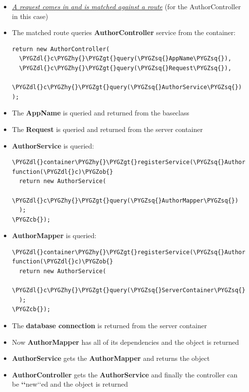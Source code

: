 \documentclass[letterpaper,10pt,english]{sphinxmanual}
\def\PYGZob{\char`\{}
\def\PYGZcb{\char`\}}
\def\PYGZgt{\char`\>}
\def\PYGZdl{\char`\$}
\def\PYGZhy{\char`\-}
\def\PYGZsq{\char`\'}
\renewcommand\PYGZsq{\textquotesingle}
\begin{document}
\begin{itemize}
\item {} 
{\hyperref[app/request::doc]{\emph{\emph{A request comes in and is matched against a route}}}} (for the AuthorController in this case)

\item {} 
The matched route queries \textbf{AuthorController} service from the container:

\begin{Verbatim}[commandchars=\\\{\}]
return new AuthorController(
  \PYGZdl{}c\PYGZhy{}\PYGZgt{}query(\PYGZsq{}AppName\PYGZsq{}),
  \PYGZdl{}c\PYGZhy{}\PYGZgt{}query(\PYGZsq{}Request\PYGZsq{}),
  \PYGZdl{}c\PYGZhy{}\PYGZgt{}query(\PYGZsq{}AuthorService\PYGZsq{})
);
\end{Verbatim}

\item {} 
The \textbf{AppName} is queried and returned from the baseclass

\item {} 
The \textbf{Request} is queried and returned from the server container

\item {} 
\textbf{AuthorService} is queried:

\begin{Verbatim}[commandchars=\\\{\}]
\PYGZdl{}container\PYGZhy{}\PYGZgt{}registerService(\PYGZsq{}AuthorService\PYGZsq{}, function(\PYGZdl{}c)\PYGZob{}
  return new AuthorService(
    \PYGZdl{}c\PYGZhy{}\PYGZgt{}query(\PYGZsq{}AuthorMapper\PYGZsq{})
  );
\PYGZcb{});
\end{Verbatim}

\item {} 
\textbf{AuthorMapper} is queried:

\begin{Verbatim}[commandchars=\\\{\}]
\PYGZdl{}container\PYGZhy{}\PYGZgt{}registerService(\PYGZsq{}AuthorMappers\PYGZsq{}, function(\PYGZdl{}c)\PYGZob{}
  return new AuthorService(
    \PYGZdl{}c\PYGZhy{}\PYGZgt{}query(\PYGZsq{}ServerContainer\PYGZsq{})\PYGZhy{}\PYGZgt{}getDb()
  );
\PYGZcb{});
\end{Verbatim}

\item {} 
The \textbf{database connection} is returned from the server container

\item {} 
Now \textbf{AuthorMapper} has all of its dependencies and the object is returned

\item {} 
\textbf{AuthorService} gets the \textbf{AuthorMapper} and returns the object

\item {} 
\textbf{AuthorController} gets the \textbf{AuthorService} and finally the controller can be {\color{red}\bfseries{}{}`{}`}new{}`{}`ed and the object is returned

\end{itemize}
\end{document}
